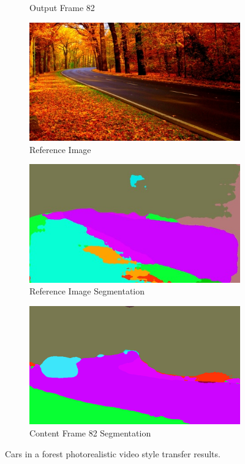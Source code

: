 \documentclass[runningheads]{llncs}
\begin{document}
\begin{figure}[h!]
\begin{subfigure}[t]{0.3\linewidth}
    \caption{Output Frame 82}
\end{subfigure}
\begin{subfigure}[t]{0.3\linewidth}
    \centering
    \includegraphics[width=1\linewidth]{cars/reference.jpg}
    \caption{Reference Image}
\end{subfigure}
\begin{subfigure}[t]{0.3\linewidth}
	\centering
	\includegraphics[width=1\linewidth]{reference_seg_cars.jpg}
	\caption{Reference Image Segmentation}
\end{subfigure}
\begin{subfigure}[t]{0.3\linewidth}
	\centering
	\includegraphics[width=1\linewidth]{cars/out0082.png}
	\caption{Content Frame 82 Segmentation}
\end{subfigure}
\caption{Cars in a forest photorealistic video style transfer results.}
\vspace{-0.2cm}
\end{figure}
\end{document}
